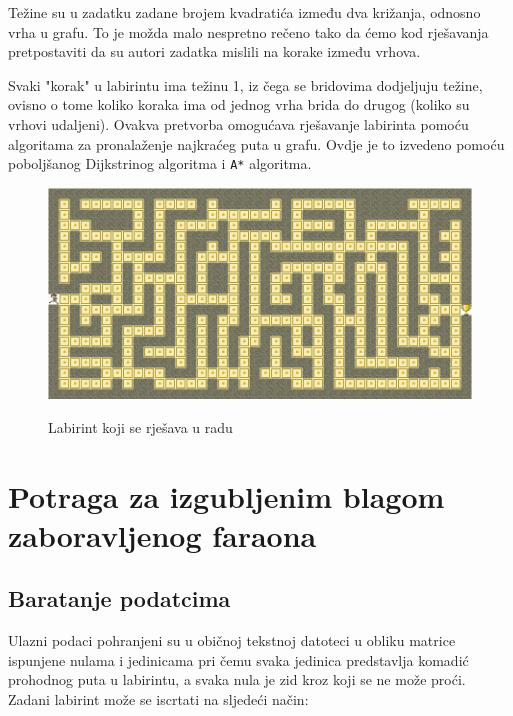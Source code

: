 \documentclass[11pt]{article}
\begin{document}
	Težine su u zadatku zadane brojem kvadratića između dva križanja, odnosno vrha u grafu. To je možda malo nespretno rečeno tako da ćemo kod rješavanja pretpostaviti da su autori zadatka mislili na korake između vrhova.
	
	Svaki "korak" u labirintu ima težinu 1, iz čega se bridovima dodjeljuju težine, ovisno o tome koliko koraka ima od jednog vrha brida do drugog (koliko su vrhovi udaljeni). Ovakva pretvorba omogućava rješavanje labirinta pomoću algoritama za pronalaženje najkraćeg puta u grafu. Ovdje je to izvedeno pomoću poboljšanog Dijkstrinog algoritma i \texttt{A*} algoritma.
	
	\begin{figure}[h]
		\centering
		\includegraphics[width=.9\linewidth]{"slikice/labirint.jpg"}
		\label{lab1}
		\caption{Labirint koji se rješava u radu}
	\end{figure}
    
    \hypertarget{potraga-za-izgubljenim-blagom-zaboravljenog-faraona}{%
\section{Potraga za izgubljenim blagom zaboravljenog
faraona}\label{potraga-za-izgubljenim-blagom-zaboravljenog-faraona}}

    \hypertarget{baratanje-podatcima}{
\subsection{Baratanje podatcima}\label{baratanje-podatcima}}

Ulazni podaci pohranjeni su u običnoj tekstnoj datoteci u obliku matrice ispunjene nulama i jedinicama pri čemu svaka jedinica predstavlja komadić prohodnog puta u labirintu, a svaka nula je zid kroz koji se ne može proći. Zadani labirint može se iscrtati na sljedeći način:
\end{document}
